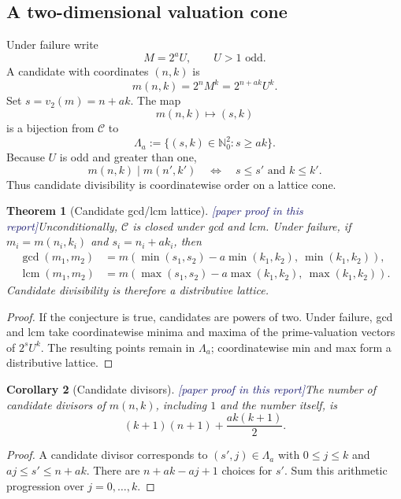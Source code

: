 \documentclass[11pt,oneside]{article}
\newtheorem{theorem}{Theorem}[section]
\newtheorem{corollary}[theorem]{Corollary}
\theoremstyle{definition}
\newcommand{\Nzero}{\mathbb N_0}
\newcommand{\Cand}{\mathcal C}
\newcommand{\tagPaper}{\textcolor{MidnightBlue}{\textsf{[paper proof in this report]}}}
\begin{document}
\subsection{A two-dimensional valuation cone}

Under failure write
\[
  M=2^aU,
  \qquad U>1\text{ odd}.
\]
A candidate with coordinates \((n,k)\) is
\[
  m(n,k)=2^nM^k=2^{n+ak}U^k.
\]
Set \(s=v_2(m)=n+ak\).  The map
\[
  m(n,k)\longmapsto(s,k)
\]
is a bijection from \(\Cand\) to
\[
  \Lambda_a:=\{(s,k)\in\Nzero^2:s\ge ak\}.
\]
Because \(U\) is odd and greater than one,
\begin{equation}\label{eq:divisibility-coordinates}
  m(n,k)\mid m(n',k')
  \quad\Longleftrightarrow\quad
  s\le s'\text{ and }k\le k'.
\end{equation}
Thus candidate divisibility is coordinatewise order on a lattice cone.

\begin{theorem}[Candidate gcd/lcm lattice]\label{thm:gcd-lcm}
\tagPaper Unconditionally, \(\Cand\) is closed under gcd and lcm.  Under failure, if
\(m_i=m(n_i,k_i)\) and \(s_i=n_i+ak_i\), then
\[
\begin{aligned}
  \gcd(m_1,m_2)
  &=m\!\left(\min(s_1,s_2)-a\min(k_1,k_2),\ \min(k_1,k_2)\right),\\
  \operatorname{lcm}(m_1,m_2)
  &=m\!\left(\max(s_1,s_2)-a\max(k_1,k_2),\ \max(k_1,k_2)\right).
\end{aligned}
\]
Candidate divisibility is therefore a distributive lattice.
\end{theorem}

\begin{proof}
If the conjecture is true, candidates are powers of two.  Under failure, gcd and lcm take
coordinatewise minima and maxima of the prime-valuation vectors of \(2^sU^k\).  The
resulting points remain in \(\Lambda_a\); coordinatewise min and max form a distributive
lattice.
\end{proof}

\begin{corollary}[Candidate divisors]\label{cor:candidate-divisors}
\tagPaper The number of candidate divisors of \(m(n,k)\), including \(1\) and the number
itself, is
\[
  \boxed{\quad
  (k+1)(n+1)+\frac{ak(k+1)}2.
  \quad}
\]
\end{corollary}

\begin{proof}
A candidate divisor corresponds to \((s',j)\in\Lambda_a\) with
\(0\le j\le k\) and \(aj\le s'\le n+ak\).  There are \(n+ak-aj+1\) choices for
\(s'\).  Sum this arithmetic progression over \(j=0,\ldots,k\).
\end{proof}
\end{document}
